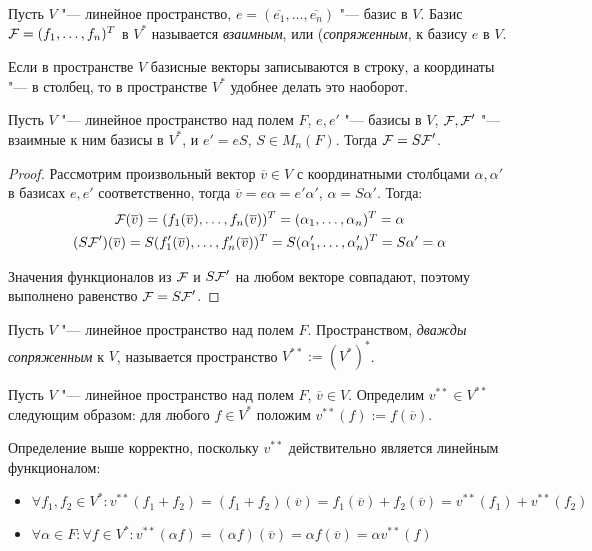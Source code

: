 \begin{definition}
	Пусть $V$ "--- линейное пространство, $e = (\overline{e_1}, \dots, \overline{e_n})$ "--- базис в $V$. Базис $\FF  = (f_1, \dotsc, f_n)^T$ в $V^*$ называется \textit{взаимным}, или (\textit{сопряженным}, к базису $e$ в $V$.
\end{definition}

\begin{note}
	Если в пространстве $V$ базисные векторы записываются в строку, а координаты "--- в столбец, то в пространстве $V^*$ удобнее делать это наоборот.
\end{note}

\begin{proposition}
	Пусть $V$ "--- линейное пространство над полем $F$, $e, e'$ "--- базисы в $V$, $\FF , \FF '$ "--- взаимные к ним базисы в $V^*$, и $e' = eS$, $S \in M_n(F)$. Тогда $\FF  = S\FF '$.
\end{proposition}

\begin{proof}
	Рассмотрим произвольный вектор $\overline{v} \in V$ с координатными столбцами $\alpha,\alpha'$ в базисах $e, e'$ соответственно, тогда $\overline{v} = e\alpha = e'\alpha'$, $\alpha = S\alpha'$. Тогда:
	\begin{gather*}
	\FF (\overline{v}) =
	(f_1(\overline{v}), \dots, f_n(\overline{v}))^T =
	(\alpha_1, \dots, \alpha_n)^T =
	\alpha
	\\
	(S\FF ')(\overline{v}) =
	S(f_1'(\overline{v}), \dots, f_n'(\overline{v}))^T =
	S(\alpha_1', \dots, \alpha_n')^T =
	S\alpha' = \alpha
	\end{gather*}
	
	Значения функционалов из $\FF $ и $S\FF '$ на любом векторе совпадают, поэтому выполнено равенство $\FF  = S\FF '$.
\end{proof}

\begin{definition}
	Пусть $V$ "--- линейное пространство над полем $F$. Пространством, \textit{дважды сопряженным} к $V$, называется пространство $V^{**} := (V^*)^*$.
\end{definition}

\begin{definition}
	Пусть $V$ "--- линейное пространство над полем $F$, $\overline{v} \in V$. Определим $v^{**} \in V^{**}$ следующим образом: для любого $f \in V^*$ положим $v^{**}(f) := f(\overline{v})$.
\end{definition}

\begin{note}
	Определение выше корректно, поскольку $v^{**}$ действительно является линейным функционалом:
	\begin{itemize}
		\item $\forall f_1, f_2 \in V^*: v^{**}(f_1 + f_2) = (f_1 + f_2)(\overline{v}) = f_1(\overline{v}) + f_2(\overline{v}) = v^{**}(f_1) + v^{**}(f_2)$
		\item $\forall \alpha \in F: \forall f \in V^*: v^{**}(\alpha f) = (\alpha f)(\overline{v}) = \alpha f(\overline{v}) = \alpha v^{**}(f)$
	\end{itemize}
\end{note}

